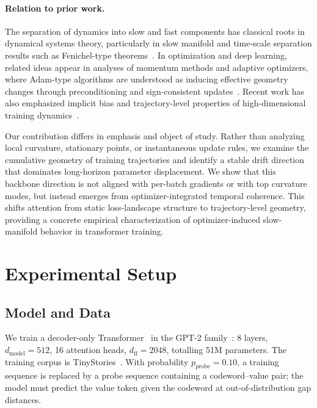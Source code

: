 \documentclass[11pt,a4paper]{article}
\begin{document}
\paragraph{Relation to prior work.}
The separation of dynamics into slow and fast components has classical roots in
dynamical systems theory, particularly in slow manifold and time-scale
separation results such as Fenichel-type
theorems~\citep{saxe2014exact}.  In optimization and deep learning, related
ideas appear in analyses of momentum methods and adaptive optimizers, where
Adam-type algorithms are understood as inducing effective geometry changes
through preconditioning and sign-consistent
updates~\citep{kingma2015adam,loshchilov2019decoupled,cohen2021gradient}.
Recent work has also emphasized implicit bias and trajectory-level properties of
high-dimensional training
dynamics~\citep{lewkowycz2020large,power2022grokking,frankle2020linear}.

Our contribution differs in emphasis and object of study.  Rather than analyzing
local curvature, stationary points, or instantaneous update rules, we examine
the cumulative geometry of training trajectories and identify a stable drift
direction that dominates long-horizon parameter displacement.  We show that this
backbone direction is not aligned with per-batch gradients or with top curvature
modes, but instead emerges from optimizer-integrated temporal coherence.  This
shifts attention from static loss-landscape structure to trajectory-level
geometry, providing a concrete empirical characterization of optimizer-induced
slow-manifold behavior in transformer training.


\section{Experimental Setup}\label{sec:setup}

\subsection{Model and Data}

We train a decoder-only Transformer~\citep{vaswani2017attention} in the GPT-2
family~\citep{radford2019language}: 8 layers, $d_{\mathrm{model}}=512$, 16
attention heads, $d_{\mathrm{ff}}=2048$, totalling 51M parameters.  The
training corpus is TinyStories~\citep{eldan2023tinystories}.  With probability
$p_{\mathrm{probe}}=0.10$, a training sequence is replaced by a probe sequence
containing a codeword--value pair; the model must predict the value token given
the codeword at out-of-distribution gap distances.
\end{document}
